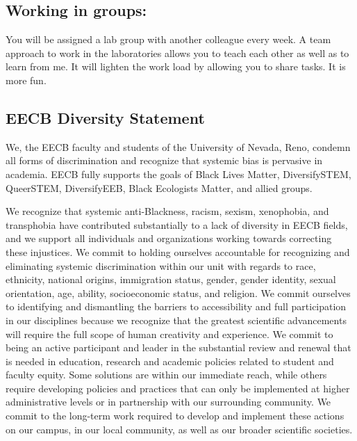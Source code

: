 \documentclass[11pt, a4paper]{article}
\begin{document}
\subsection*{Working in groups:} You will be assigned a lab group
with another colleague every week. A team approach to work in
the laboratories allows you to teach each other as well as to learn
from me. It will lighten the work load by allowing you to share
tasks. It is more fun.

\subsection*{EECB Diversity Statement}
We, the EECB faculty and students of the University of Nevada, Reno, condemn all forms of discrimination and recognize that systemic bias is pervasive in academia. EECB fully supports the goals of Black Lives Matter, DiversifySTEM, QueerSTEM, DiversifyEEB, Black Ecologists Matter, and allied groups.

We recognize that systemic anti-Blackness, racism, sexism, xenophobia, and transphobia have contributed substantially to a lack of diversity in EECB fields, and we support all individuals and organizations working towards correcting these injustices. We commit to holding ourselves accountable for recognizing and eliminating systemic discrimination within our unit with regards to race, ethnicity, national origins, immigration status, gender, gender identity, sexual orientation, age, ability, socioeconomic status, and religion. We commit ourselves to identifying and dismantling the barriers to accessibility and full participation in our disciplines because we recognize that the greatest scientific advancements will require the full scope of human creativity and experience. We commit to being an active participant and leader in the substantial review and renewal that is needed in education, research and academic policies related to student and faculty equity. Some solutions are within our immediate reach, while others require developing policies and practices that can only be implemented at higher administrative levels or in partnership with our surrounding community. We commit to the long-term work required to develop and implement these actions on our campus, in our local community, as well as our broader scientific societies.
\end{document}
